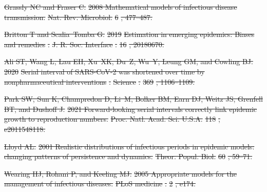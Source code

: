 \documentclass[12pt]{article}
\providecommand{\DIFdeltex}[1]{{\protect\color{red}\sout{#1}}}                      %
\providecommand{\DIFdel}[1]{\texorpdfstring{\DIFdeltex{#1}}{}} %
\begin{document}
\DIFdel{Grassly NC and Fraser C.
}%
\DIFdel{2008 Mathematical models of infectious disease transmission.
}%
\DIFdel{Nat. Rev. Microbiol.}%
\DIFdel{6}%
\DIFdel{, 477--487.
}%

\DIFdel{Britton T and Scalia~Tomba G.
}%
\DIFdel{2019 }%
\DIFdel{Estimation in emerging epidemics: Biases and remedies}%
\DIFdel{.
}%
\DIFdel{J. R. Soc. Interface}%
\DIFdel{.
}%
\DIFdel{16}%
\DIFdel{, 20180670.
}%

\DIFdel{Ali ST, Wang L, Lau EH, Xu~XK, Du~Z, Wu~Y, Leung GM, and Cowling BJ.
}%
\DIFdel{2020 }%
\DIFdel{Serial interval of SARS-CoV-2 was shortened over time by
  nonpharmaceutical interventions}%
\DIFdel{.
}%
\DIFdel{Science}%
\DIFdel{.
}%
\DIFdel{369}%
\DIFdel{, 1106--1109.
}%

\DIFdel{Park SW, Sun K, Champredon D, Li~M, Bolker BM, Earn DJ, Weitz JS, Grenfell BT,
  and Dushoff J.
}%
\DIFdel{2021 Forward-looking serial intervals correctly link epidemic growth
  to reproduction numbers.
}%
\DIFdel{Proc. Natl. Acad. Sci. U.S.A.}%
\DIFdel{118}%
\DIFdel{, e2011548118.
}%

\DIFdel{Lloyd AL.
}%
\DIFdel{2001 Realistic distributions of infectious periods in epidemic
  models: changing patterns of persistence and dynamics.
}%
\DIFdel{Theor. Popul. Biol.}%
\DIFdel{60}%
\DIFdel{, 59--71.
}%

\DIFdel{Wearing HJ, Rohani P, and Keeling MJ.
}%
\DIFdel{2005 Appropriate models for the management of infectious diseases.
}%
\DIFdel{PLoS medicine}%
\DIFdel{.
}%
\DIFdel{2}%
\DIFdel{, e174.
}%
\end{document}
